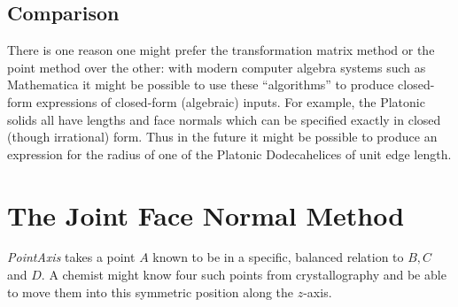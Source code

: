 \documentclass{svproc}
\begin{document}




\subsection{Comparison}

There is one reason one might prefer the transformation matrix method or the point method over the other: with modern
computer algebra systems such as Mathematica\cite{Mathematica} it might be possible to use these ``algorithms'' to produce closed-form
expressions of closed-form (algebraic) inputs. For example, the Platonic solids all have lengths and face normals which
can be specified exactly in closed (though irrational) form.
Thus in the future it might be possible to produce an expression for the
radius of one of the Platonic Dodecahelices of unit edge length.


\section{The Joint Face Normal Method}
\label{sec:facenormal}

{\em PointAxis} takes a point $A$ known to be in a specific, balanced relation
to $B, C$ and $D$. A chemist might know four such points from crystallography
and be able to move them into this symmetric position along the $z$-axis.
\end{document}
